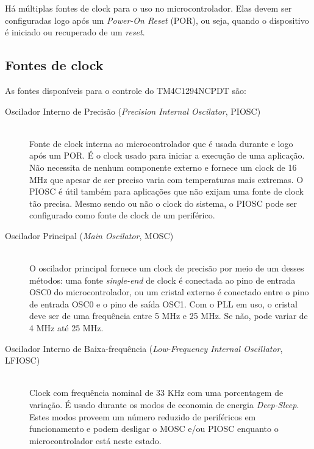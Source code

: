 Há múltiplas fontes de clock para o uso no microcontrolador. Elas devem ser configuradas logo após um \emph{Power-On Reset} (POR), ou seja, quando o dispositivo é iniciado ou recuperado de um \emph{reset}.

\subsection{Fontes de clock}
As fontes disponíveis para o controle do TM4C1294NCPDT são:

\begin{description}
	\item [Oscilador Interno de Precisão (\emph{Precision Internal Oscilator}, PIOSC)]\hfill \\
	Fonte de clock interna ao microcontrolador que é usada durante e logo após um POR. É o clock usado para iniciar a execução de uma aplicação. Não necessita de nenhum componente externo e fornece um clock de 16 MHz que apesar de ser preciso varia com temperaturas mais extremas. O PIOSC é útil também para aplicações que não exijam uma fonte de clock tão precisa. Mesmo sendo ou não o clock do sistema, o PIOSC pode ser configurado como fonte de clock de um periférico.
	
	\item [Oscilador Principal (\emph{Main Oscilator}, MOSC)]\hfill \\
	O oscilador principal fornece um clock de precisão por meio de um desses métodos: uma fonte \emph{single-end} de clock é conectada ao pino de entrada OSC0 do microcontrolador, ou um cristal externo é conectado entre o pino de entrada OSC0 e o pino de saída OSC1. Com o PLL em uso, o cristal deve ser de uma frequência entre 5 MHz e 25 MHz. Se não, pode variar de 4 MHz até 25 MHz.
	
	\item [Oscilador Interno de Baixa-frequência (\emph{Low-Frequency Internal Oscillator}, LFIOSC)]\hfill \\
	Clock com frequência nominal de 33 KHz com uma porcentagem de variação. É usado durante os modos de economia de energia \emph{Deep-Sleep}. Estes modos proveem um número reduzido de periféricos em funcionamento e podem desligar o MOSC e/ou PIOSC enquanto o microcontrolador está neste estado.
	

\end{description}
